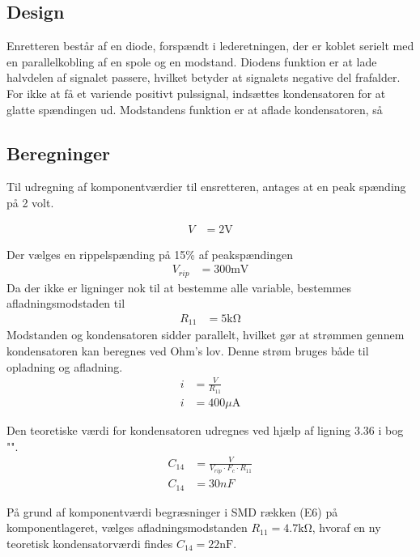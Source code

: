 \subsection{Design}
Enretteren består af en diode, forspændt i lederetningen, der er koblet serielt med en parallelkobling af en spole og en modstand. 
Diodens funktion er at lade halvdelen af signalet passere, hvilket betyder at signalets negative del frafalder. 
For ikke at få et variende positivt pulssignal, indsættes kondensatoren for at glatte spændingen ud. Modstandens funktion er at aflade kondensatoren, så



\subsection{Beregninger}
Til udregning af komponentværdier til ensretteren, antages at en peak spænding på 2 volt.

\begin{align}
	V & = 2 \si{\volt} \nonumber
\end{align}

Der vælges en rippelspænding på 15\% af peakspændingen
\begin{align}
	V_{rip} & = 300 \si{\milli\volt} \nonumber
\end{align}
Da der ikke er ligninger nok til at bestemme alle variable, bestemmes afladningsmodstaden til
\begin{align}
	R_{11} & = 5 \si{\kilo\ohm} \nonumber
\end{align}
Modstanden og kondensatoren sidder parallelt, hvilket gør at strømmen gennem kondensatoren kan beregnes ved Ohm's lov. Denne strøm bruges både til opladning og afladning.
\begin{align}
	i & = \frac{V}{R_{11}} \\
	i & = 400 \si{\mu\ampere}\nonumber
\end{align}

Den teoretiske værdi for kondensatoren udregnes ved hjælp af ligning 3.36 i bog "\cite[side. 160]{Sedra19uu}".
\begin{align}
	C_{14} & = \frac{V}{V_{rip} \cdot F_c \cdot R_{11}}\\
		C_{14} & = 30nF \nonumber
\end{align}

	
På grund af komponentværdi begræsninger i SMD rækken (E6) på komponentlageret, vælges afladningsmodstanden $R_{11} = 4.7 \si{\kilo\ohm}$, hvoraf en ny teoretisk kondensatorværdi findes $C_{14} = 22 \si{\nano\farad}$.


